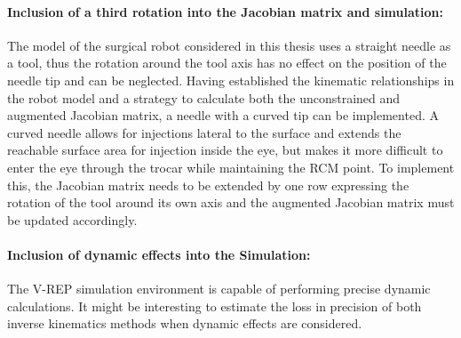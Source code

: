 \paragraph{Inclusion of a third rotation into the Jacobian matrix and simulation:} The model of the surgical robot considered in this thesis uses a straight needle as a tool, thus the rotation around the tool axis has no effect on the position of the needle tip and can be neglected. Having established the kinematic relationships in the robot model and a strategy to calculate both the unconstrained and augmented Jacobian matrix, a needle with a curved tip can be implemented. A curved needle allows for injections lateral to the surface and extends the reachable surface area for injection inside the eye, but makes it more difficult to enter the eye through the trocar while maintaining the RCM point. To implement this, the Jacobian matrix needs to be extended by one row expressing the rotation of the tool around its own axis and the augmented Jacobian matrix must be updated accordingly.

\paragraph{Inclusion of dynamic effects into the Simulation:} The V-REP simulation environment is capable of performing precise dynamic calculations. It might be interesting to estimate the loss in precision of both inverse kinematics methods when dynamic effects are considered. 
